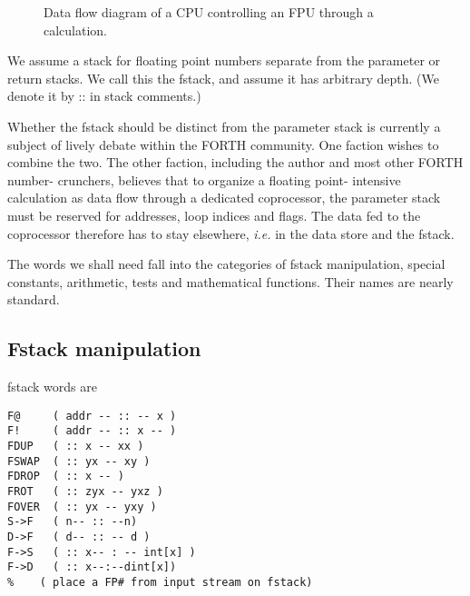 \begin{figure}[H]
    \caption{Data flow diagram of a CPU controlling an FPU through a calculation.}
    \label{fig:03_01}
\end{figure}

We assume a stack for floating point numbers separate from the 
parameter or return stacks. We call this the fstack, and assume it
has arbitrary depth. (We denote it by :: in stack comments.)

\leftbar[1\linewidth] \noindent
Whether the fstack should be distinct from the parameter stack
is currently a subject of lively debate within the FORTH community. 
One faction wishes to combine the two. The other
faction, including the author and most other FORTH number-
crunchers, believes that to organize a floating point- intensive
calculation as data flow through a dedicated coprocessor, the
parameter stack must be reserved for addresses, loop indices and
flags. The data fed to the coprocessor therefore has to stay
elsewhere, \textit{i.e.} in the data store and the fstack.
\endleftbar

The words we shall need fall into the categories of fstack 
manipulation, special constants, arithmetic, tests and mathematical functions.
Their names are nearly standard.

\subsection{Fstack manipulation}
 fstack words are
\begin{verbatim}
F@     ( addr -- :: -- x )
F!     ( addr -- :: x -- )
FDUP   ( :: x -- xx )
FSWAP  ( :: yx -- xy )
FDROP  ( :: x -- )
FROT   ( :: zyx -- yxz )
FOVER  ( :: yx -- yxy )
S->F   ( n-- :: --n)
D->F   ( d-- :: -- d )
F->S   ( :: x-- : -- int[x] )
F->D   ( :: x--:--dint[x])
%    ( place a FP# from input stream on fstack)
\end{verbatim}
 
